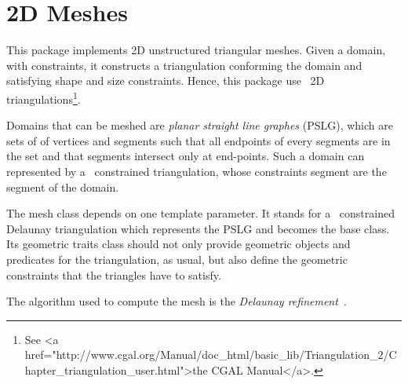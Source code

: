 \chapter{2D Meshes}

This package implements 2D unstructured triangular meshes. Given a
domain, with constraints, it constructs a triangulation conforming the
domain and satisfying shape and size constraints. Hence, this package 
use \cgal\ 2D triangulations\footnote{See 
{<a href="http://www.cgal.org/Manual/doc_html/basic_lib/Triangulation_2/Chapter_triangulation_user.html">the CGAL Manual</a>.}}.

Domains that can be meshed are \emph{planar straight line graphes}
(PSLG), which are sets of of vertices and segments such that all
endpoints of every segments are in the set and that segments intersect
only at end-points. Such a domain can represented by a \cgal\ 
constrained triangulation, whose constraints segment are the segment of the
domain.

The mesh class depends on one template parameter. It stands for a
\cgal\ constrained Delaunay triangulation which represents the PSLG
and becomes the base class. Its geometric traits class should not only
provide geometric objects and predicates for the triangulation, as
usual, but also define the geometric constraints that the triangles
have to satisfy.

The algorithm used to compute the mesh is the \emph{Delaunay
refinement}~\cite{s-mgdsa-00}.
